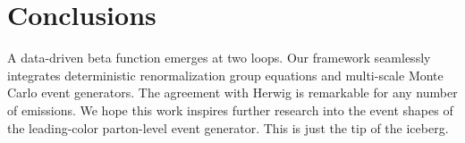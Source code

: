 \section{Conclusions}\label{sec:conclusions}

A data-driven beta function emerges at two loops. Our framework
seamlessly integrates deterministic renormalization group equations and
multi-scale Monte Carlo event generators. The agreement with Herwig is
remarkable for any number of emissions. We hope this work inspires
further research into the event shapes of the leading-color parton-level
event generator. This is just the tip of the iceberg.

